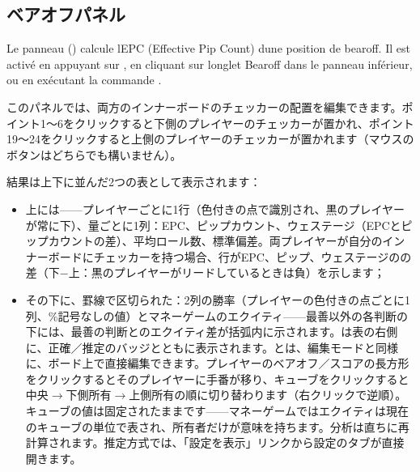 \documentclass[letterpaper,10pt,dvipdfmx]{sphinxmanual}
\begin{document}
\subsection{ベアオフパネル}
\label{\detokenize{manuel:panneau-bearoff}}\label{\detokenize{manuel:panneau-epc}}
\sphinxAtStartPar
Le panneau  () calcule l\textquotesingle{}EPC (Effective Pip Count) d\textquotesingle{}une
position de bearoff. Il est activé en appuyant sur , en cliquant sur
l\textquotesingle{}onglet Bearoff dans le panneau inférieur, ou en exécutant la commande
.

\sphinxAtStartPar
このパネルでは、両方のインナーボードのチェッカーの配置を編集できます。ポイント1〜6をクリックすると下側のプレイヤーのチェッカーが置かれ、ポイント19〜24をクリックすると上側のプレイヤーのチェッカーが置かれます（マウスのボタンはどちらでも構いません）。

\sphinxAtStartPar
結果は上下に並んだ2つの表として表示されます：
\begin{itemize}
\item {} 
\sphinxAtStartPar
上には——プレイヤーごとに1行（色付きの点で識別され、黒のプレイヤーが常に下）、量ごとに1列：EPC、ピップカウント、ウェステージ（EPCとピップカウントの差）、平均ロール数、標準偏差。両プレイヤーが自分のインナーボードにチェッカーを持つ場合、行がEPC、ピップ、ウェステージのの差（下−上：黒のプレイヤーがリードしているときは負）を示します；

\item {} 
\sphinxAtStartPar
その下に、罫線で区切られた：2列の勝率（プレイヤーの色付きの点ごとに1列、\%記号なしの値）とマネーゲームのエクイティ——最善以外の各判断の下には、最善の判断とのエクイティ差が括弧内に示されます。は表の右側に、正確／推定のバッジとともに表示されます。とは、編集モードと同様に、ボード上で直接編集できます。プレイヤーのベアオフ／スコアの長方形をクリックするとそのプレイヤーに手番が移り、キューブをクリックすると中央\(\rightarrow\)下側所有\(\rightarrow\)上側所有の順に切り替わります（右クリックで逆順）。キューブの値は固定されたままです——マネーゲームではエクイティは現在のキューブの単位で表され、所有者だけが意味を持ちます。分析は直ちに再計算されます。推定方式では、「設定を表示」リンクから設定のタブが直接開きます。

\end{itemize}
\end{document}

